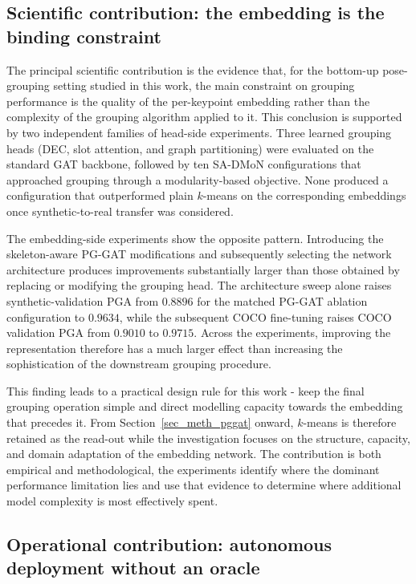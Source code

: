 \subsection{Scientific contribution: the embedding is the binding constraint}
\label{sec_conc_contrib_embedding}

The principal scientific contribution is the evidence that, for the
bottom-up pose-grouping setting studied in this work, the main
constraint on grouping performance is the quality of the per-keypoint
embedding rather than the complexity of the grouping algorithm applied
to it.
This conclusion is supported by two independent families of head-side
experiments.
Three learned grouping heads (DEC,
slot attention,
and graph partitioning) were evaluated on the standard GAT backbone,
followed by ten SA-DMoN configurations that approached grouping through
a modularity-based objective.
None produced a configuration that outperformed plain $k$-means on the
corresponding embeddings once synthetic-to-real transfer was considered.

The embedding-side experiments show the opposite pattern.
Introducing the skeleton-aware PG-GAT modifications and subsequently
selecting the network architecture produces improvements substantially
larger than those obtained by replacing or modifying the grouping head.
The architecture sweep alone raises synthetic-validation PGA from
$0.8896$ for the matched PG-GAT ablation configuration to $0.9634$,
while the subsequent COCO fine-tuning raises COCO validation PGA from
$0.9010$ to $0.9715$.
Across the experiments, improving the representation therefore has a
much larger effect than increasing the sophistication of the downstream
grouping procedure.

This finding leads to a practical design rule for this work -
keep the final grouping operation simple and direct modelling capacity
towards the embedding that precedes it.
From Section~\ref{sec_meth_pggat} onward,
$k$-means is therefore retained as the read-out while the investigation
focuses on the structure,
capacity,
and domain adaptation of the embedding network.
The contribution is both empirical and methodological,
the experiments identify where the dominant performance limitation lies
and use that evidence to determine where additional model complexity is
most effectively spent.

\subsection{Operational contribution: autonomous deployment without an oracle}
\label{sec_conc_contrib_autonomy}

